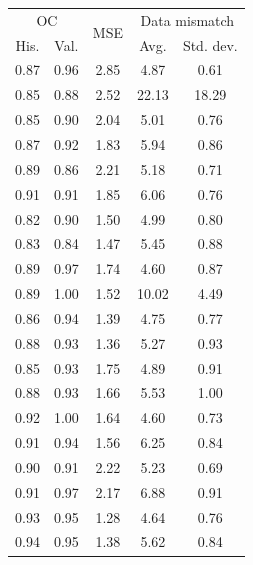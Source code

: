 \begin{tabular}{ccccc}
\toprule
\multicolumn{2}{c}{OC} & 
\multirow{2}{*}{
    MSE
} & 
\multicolumn{2}{c}{Data mismatch} 
\\
His. & Val. &  & Avg. & Std. dev.
\\
\midrule
0.87 & 0.96 & 2.85 & 4.87 & 0.61 \\
0.85 & 0.88 & 2.52 & 22.13 & 18.29 \\
\midrule
0.85 & 0.90 & 2.04 & 5.01 & 0.76 \\
0.87 & 0.92 & 1.83 & 5.94 & 0.86 \\
\midrule
0.89 & 0.86 & 2.21 & 5.18 & 0.71 \\
0.91 & 0.91 & 1.85 & 6.06 & 0.76 \\
\midrule
0.82 & 0.90 & 1.50 & 4.99 & 0.80 \\
0.83 & 0.84 & 1.47 & 5.45 & 0.88 \\
\midrule
0.89 & 0.97 & 1.74 & 4.60 & 0.87 \\
0.89 & 1.00 & 1.52 & 10.02 & 4.49 \\
\midrule
0.86 & 0.94 & 1.39 & 4.75 & 0.77 \\
0.88 & 0.93 & 1.36 & 5.27 & 0.93 \\
\midrule
0.85 & 0.93 & 1.75 & 4.89 & 0.91 \\
0.88 & 0.93 & 1.66 & 5.53 & 1.00 \\
\midrule
0.92 & 1.00 & 1.64 & 4.60 & 0.73 \\
0.91 & 0.94 & 1.56 & 6.25 & 0.84 \\
\midrule
0.90 & 0.91 & 2.22 & 5.23 & 0.69 \\
0.91 & 0.97 & 2.17 & 6.88 & 0.91 \\
\midrule
0.93 & 0.95 & 1.28 & 4.64 & 0.76 \\
0.94 & 0.95 & 1.38 & 5.62 & 0.84 \\
\bottomrule
\end{tabular}
